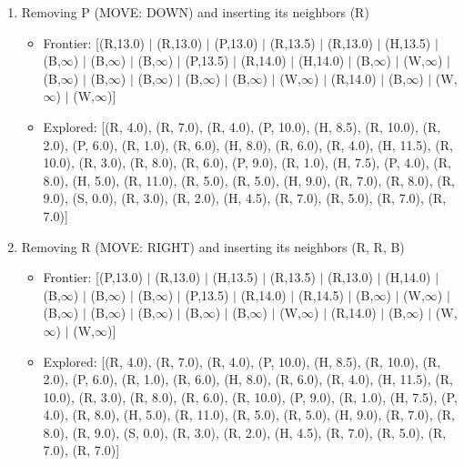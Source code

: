 \documentclass[12pt]{article}
\begin{document}
\begin{enumerate}
\item Removing P (MOVE: DOWN) and inserting its neighbors (R)
\begin{itemize}
\item Frontier: [(R,13.0) \(|\) (R,13.0) \(|\) (P,13.0) \(|\) (R,13.5) \(|\) (R,13.0) \(|\) (H,13.5) \(|\) (B,\(\infty\)) \(|\) (B,\(\infty\)) \(|\) (B,\(\infty\)) \(|\) (P,13.5) \(|\) (R,14.0) \(|\) (H,14.0) \(|\) (B,\(\infty\)) \(|\) (W,\(\infty\)) \(|\) (B,\(\infty\)) \(|\) (B,\(\infty\)) \(|\) (B,\(\infty\)) \(|\) (B,\(\infty\)) \(|\) (B,\(\infty\)) \(|\) (W,\(\infty\)) \(|\) (R,14.0) \(|\) (B,\(\infty\)) \(|\) (W,\(\infty\)) \(|\) (W,\(\infty\))]
\item Explored: [(R, 4.0), (R, 7.0), (R, 4.0), (P, 10.0), (H, 8.5), (R, 10.0), (R, 2.0), (P, 6.0), (R, 1.0), (R, 6.0), (H, 8.0), (R, 6.0), (R, 4.0), (H, 11.5), (R, 10.0), (R, 3.0), (R, 8.0), (R, 6.0), (P, 9.0), (R, 1.0), (H, 7.5), (P, 4.0), (R, 8.0), (H, 5.0), (R, 11.0), (R, 5.0), (R, 5.0), (H, 9.0), (R, 7.0), (R, 8.0), (R, 9.0), (S, 0.0), (R, 3.0), (R, 2.0), (H, 4.5), (R, 7.0), (R, 5.0), (R, 7.0), (R, 7.0)]
\end{itemize}

\item Removing R (MOVE: RIGHT) and inserting its neighbors (R, R, B)
\begin{itemize}
\item Frontier: [(P,13.0) \(|\) (R,13.0) \(|\) (H,13.5) \(|\) (R,13.5) \(|\) (R,13.0) \(|\) (H,14.0) \(|\) (B,\(\infty\)) \(|\) (B,\(\infty\)) \(|\) (B,\(\infty\)) \(|\) (P,13.5) \(|\) (R,14.0) \(|\) (R,14.5) \(|\) (B,\(\infty\)) \(|\) (W,\(\infty\)) \(|\) (B,\(\infty\)) \(|\) (B,\(\infty\)) \(|\) (B,\(\infty\)) \(|\) (B,\(\infty\)) \(|\) (B,\(\infty\)) \(|\) (W,\(\infty\)) \(|\) (R,14.0) \(|\) (B,\(\infty\)) \(|\) (W,\(\infty\)) \(|\) (W,\(\infty\))]
\item Explored: [(R, 4.0), (R, 7.0), (R, 4.0), (P, 10.0), (H, 8.5), (R, 10.0), (R, 2.0), (P, 6.0), (R, 1.0), (R, 6.0), (H, 8.0), (R, 6.0), (R, 4.0), (H, 11.5), (R, 10.0), (R, 3.0), (R, 8.0), (R, 6.0), (R, 10.0), (P, 9.0), (R, 1.0), (H, 7.5), (P, 4.0), (R, 8.0), (H, 5.0), (R, 11.0), (R, 5.0), (R, 5.0), (H, 9.0), (R, 7.0), (R, 8.0), (R, 9.0), (S, 0.0), (R, 3.0), (R, 2.0), (H, 4.5), (R, 7.0), (R, 5.0), (R, 7.0), (R, 7.0)]
\end{itemize}


\end{enumerate}
\end{document}
